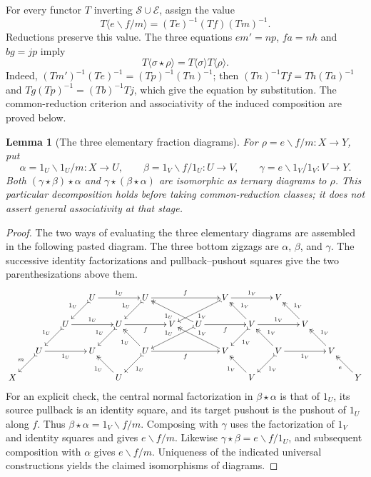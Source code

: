 \documentclass[11pt,reqno,a4paper]{amsart}
\newtheorem{lemma}[theorem]{Lemma}
\theoremstyle{definition}
\theoremstyle{remark}
\newcommand{\0}{\mathbf{0}}
\renewcommand{\1}{\mathbf{1}}
\newcommand{\Sden}{\mathcal S}
\newcommand{\Eden}{\mathcal E}
\begin{document}
For every functor $T$ inverting $\Sden\cup\Eden$, assign the value
\[
 T\langle e\backslash f/m\rangle=(Te)^{-1}(Tf)(Tm)^{-1}.
\]
Reductions preserve this value. The three equations
$em'=np$, $fa=nh$ and $bg=jp$ imply
\begin{equation}\label{di:eq:composition-value}
 T\langle\sigma\star\rho\rangle
   =T\langle\sigma\rangle T\langle\rho\rangle.
\end{equation}
Indeed, $(Tm')^{-1}(Te)^{-1}=(Tp)^{-1}(Tn)^{-1}$;
then $(Tn)^{-1}Tf=Th(Ta)^{-1}$ and
$Tg(Tp)^{-1}=(Tb)^{-1}Tj$, which give the equation by substitution.
The common-reduction criterion and associativity of the induced
composition are proved below.


\begin{lemma}[The three elementary fraction diagrams]\label{di:lem:three-factor-diagram}
For $\rho=e\backslash f/m:X\to Y$, put
\[
 \alpha=1_U\backslash1_U/m:X\to U,\qquad
 \beta=1_V\backslash f/1_U:U\to V,\qquad
 \gamma=e\backslash1_V/1_V:V\to Y.
\]
Both $(\gamma\star\beta)\star\alpha$ and
$\gamma\star(\beta\star\alpha)$ are isomorphic as ternary diagrams
to $\rho$. This particular decomposition holds before taking
common-reduction classes; it does not assert general associativity
at that stage.
\end{lemma}
\begin{proof}
The two ways of evaluating the three elementary diagrams are
assembled in the following pasted diagram. The three bottom zigzags
are $\alpha$, $\beta$, and $\gamma$. The successive identity
factorizations and pullback--pushout squares give the two
parenthesizations above them.
\begin{equation}\label{di:eq:large-decomposition}
\vcenter{\xymatrix@!=7pt{ & & & U\ar@{>->}[dl]_-{1_U}\ar[rr]^-{1_U} & & U\ar@{>->}[dl]_-{1_U}\ar[rrr]^-{f}\ar@{<<-}[drr]_-{1_U} & & & V\ar@{>->}[dll]^-{1_V}\ar[rr]^-{1_V}\ar@{<<-}[dr]^-{1_V} & & V\ar@{<<-}[dr]^-{1_V} \\ & & U\ar@{>->}[dl]_-{1_U}\ar[rr]^-{1_U} & & U\ar@{>->}[dl]_-{1_U}\ar[rr]_-{f}\ar@{<<-}[dr]_-{1_U} & & V\ar@{<<-}[drr]^-{1_V} & U\ar@{>->}[dll]_-{1_U}\ar[rr]_-{f} & & V\ar@{>->}[dl]^-{1_V}\ar[rr]^-{1_V}\ar@{<<-}[dr]^-{1_V} & & V\ar@{<<-}[dr]^-{1_V} \\ & U\ar@{>->}[dl]_-{m}\ar[rr]_-{1_U} & & U\ar@{<<-}[dr]_-{1_U}  & & U\ar@{>->}[dl]^-{1_U}\ar[rrr]_-{f} & & & V\ar@{<<-}[dr]_-{1_V} & & V\ar@{>->}[dl]^-{1_V}\ar[rr]_-{1_V} & & V\ar@{<<-}[dr]_-{e}\\ X & & & & U & & &  & & V & & & & Y }}
\end{equation}
For an explicit check, the central normal factorization in
$\beta\star\alpha$ is that of $1_U$, its source pullback is
an identity square, and its target pushout is the pushout of
$1_U$ along $f$. Thus $\beta\star\alpha=1_V\backslash f/m$.
Composing with $\gamma$ uses the factorization of $1_V$ and
identity squares and gives $e\backslash f/m$. Likewise
$\gamma\star\beta=e\backslash f/1_U$, and subsequent composition
with $\alpha$ gives $e\backslash f/m$. Uniqueness of the indicated
universal constructions yields the claimed isomorphisms of diagrams.
\end{proof}
\end{document}
